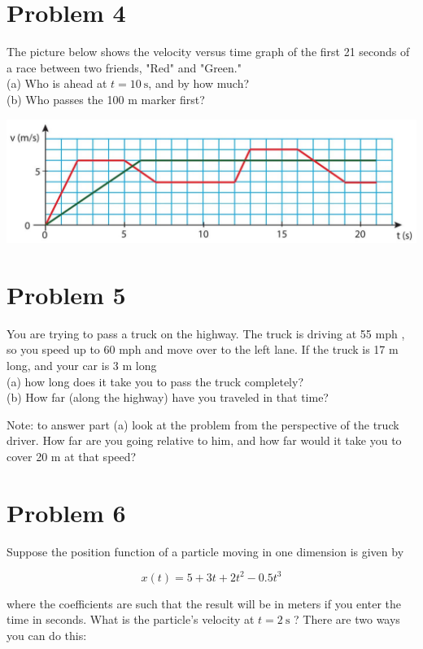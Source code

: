 \documentclass[10pt]{article}
\begin{document}
\section*{Problem 4}
The picture below shows the velocity versus time graph of the first 21 seconds of a race between two friends, "Red" and "Green."\\
(a) Who is ahead at $t=10 \mathrm{~s}$, and by how much?\\
(b) Who passes the 100 m marker first?

\begin{center}
\includegraphics[max width=\textwidth]{2024_09_14_9969b06773f10b6936e8g-046(1)}
\end{center}

\section*{Problem 5}
You are trying to pass a truck on the highway. The truck is driving at 55 mph , so you speed up to 60 mph and move over to the left lane. If the truck is 17 m long, and your car is 3 m long\\
(a) how long does it take you to pass the truck completely?\\
(b) How far (along the highway) have you traveled in that time?

Note: to answer part (a) look at the problem from the perspective of the truck driver. How far are you going relative to him, and how far would it take you to cover 20 m at that speed?

\section*{Problem 6}
Suppose the position function of a particle moving in one dimension is given by


\begin{equation*}
x(t)=5+3 t+2 t^{2}-0.5 t^{3} \tag{1.30}
\end{equation*}


where the coefficients are such that the result will be in meters if you enter the time in seconds. What is the particle's velocity at $t=2 \mathrm{~s}$ ? There are two ways you can do this:
\end{document}

